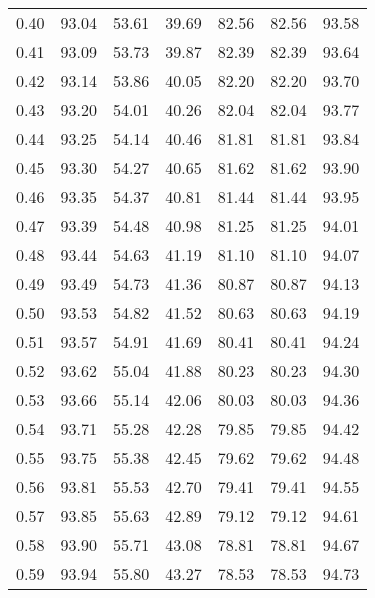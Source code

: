 \begin{tabular}{|c|c|c|c|c|c|c|}
      0.40 &     93.04 &     53.61 &      39.69 &   82.56 &      82.56 &         93.58 \\
      0.41 &     93.09 &     53.73 &      39.87 &   82.39 &      82.39 &         93.64 \\
      0.42 &     93.14 &     53.86 &      40.05 &   82.20 &      82.20 &         93.70 \\
      0.43 &     93.20 &     54.01 &      40.26 &   82.04 &      82.04 &         93.77 \\
      0.44 &     93.25 &     54.14 &      40.46 &   81.81 &      81.81 &         93.84 \\
      0.45 &     93.30 &     54.27 &      40.65 &   81.62 &      81.62 &         93.90 \\
      0.46 &     93.35 &     54.37 &      40.81 &   81.44 &      81.44 &         93.95 \\
      0.47 &     93.39 &     54.48 &      40.98 &   81.25 &      81.25 &         94.01 \\
      0.48 &     93.44 &     54.63 &      41.19 &   81.10 &      81.10 &         94.07 \\
      0.49 &     93.49 &     54.73 &      41.36 &   80.87 &      80.87 &         94.13 \\
      0.50 &     93.53 &     54.82 &      41.52 &   80.63 &      80.63 &         94.19 \\
      0.51 &     93.57 &     54.91 &      41.69 &   80.41 &      80.41 &         94.24 \\
      0.52 &     93.62 &     55.04 &      41.88 &   80.23 &      80.23 &         94.30 \\
      0.53 &     93.66 &     55.14 &      42.06 &   80.03 &      80.03 &         94.36 \\
      0.54 &     93.71 &     55.28 &      42.28 &   79.85 &      79.85 &         94.42 \\
      0.55 &     93.75 &     55.38 &      42.45 &   79.62 &      79.62 &         94.48 \\
      0.56 &     93.81 &     55.53 &      42.70 &   79.41 &      79.41 &         94.55 \\
      0.57 &     93.85 &     55.63 &      42.89 &   79.12 &      79.12 &         94.61 \\
      0.58 &     93.90 &     55.71 &      43.08 &   78.81 &      78.81 &         94.67 \\
      0.59 &     93.94 &     55.80 &      43.27 &   78.53 &      78.53 &         94.73 \\

\end{tabular}
